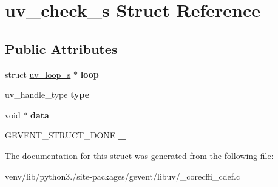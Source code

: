 \hypertarget{structuv__check__s}{}\section{uv\+\_\+check\+\_\+s Struct Reference}
\label{structuv__check__s}
\subsection*{Public Attributes}
\begin{DoxyCompactItemize}
\item 
\mbox{\label{structuv__check__s_a1660589c0c59c8cc5b46ea06b0d10ce5}} 
struct \hyperlink{structuv__loop__s}{uv\+\_\+loop\+\_\+s} $\ast$ {\bfseries loop}
\item 
\mbox{\label{structuv__check__s_a5b6746282f08d08edcd0796d59b50648}} 
uv\+\_\+handle\+\_\+type {\bfseries type}
\item 
\mbox{\label{structuv__check__s_aa545520f33afee9bc3e8c93235c326a4}} 
void $\ast$ {\bfseries data}
\item 
\mbox{\label{structuv__check__s_a5f03d3c8078105ee3cba5ec3e7f044ff}} 
G\+E\+V\+E\+N\+T\+\_\+\+S\+T\+R\+U\+C\+T\+\_\+\+D\+O\+NE {\bfseries \+\_\+}
\end{DoxyCompactItemize}


The documentation for this struct was generated from the following file\+:\begin{DoxyCompactItemize}
\item 
venv/lib/python3./site-\/packages/gevent/libuv/\+\_\+corecffi\+\_\+cdef.\+c\end{DoxyCompactItemize}
